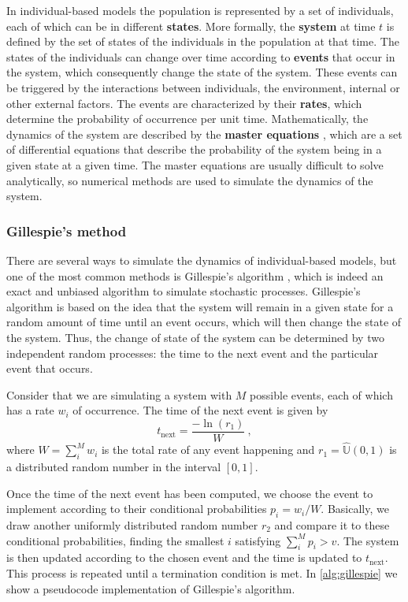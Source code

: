 In individual-based models the population is represented by a set of
individuals, each of which can be in different \textbf{states}. More
formally, the \textbf{system} at time $t$ is defined by the set of states of
the individuals in the population at that time. The states of the individuals
can change over time according to \textbf{events} that occur in the system,
which consequently change the state of the system. These events can be
triggered by the interactions between individuals, the environment, internal or
other external factors. The events are characterized by their \textbf{rates},
which determine the probability of occurrence per unit time. Mathematically,
the dynamics of the system are described by the \textbf{master equations}
\cite{Toral_master_eqs}, which are a set of differential equations that
describe the probability of the system being in a given state at a given
time.
The master equations are usually difficult to solve analytically, so
numerical
methods are used to simulate the dynamics of the system.

\subsubsection*{Gillespie's method}

There are several ways to simulate the dynamics of individual-based models,
but
one of the most common methods is Gillespie's algorithm
\cite{Gillespie1977},
which is indeed an exact and unbiased algorithm to simulate stochastic
processes. Gillespie's algorithm is based on the idea that the system will
remain in a given state for a random amount of time until an event occurs,
which will then change the state of the system. Thus, the change of state of
the system can be determined by two independent random processes: the time to
the next event and the particular event that occurs.

Consider that we are simulating a system with $M$ possible events, each of
which has a rate $w_i$ of occurrence. The time of the next event is given by
\begin{equation}
  t_{\textrm{next}}=\frac{-\ln(r_1)}{W} \ ,
\end{equation}
where $W=\sum_i^M w_i$ is the total rate of any event happening and
$r_1=\hat{\mathbb{U}}(0,1)$ is a distributed random number in the interval
$[0,1]$.

Once the time of the next event has been computed, we choose the event to
implement according to their conditional probabilities $p_i=w_i/W$.
Basically,
we draw another uniformly distributed random number $r_2$ and compare it to
these conditional probabilities, finding the smallest $i$ satisfying
$\sum_i^Mp_i>v$. The system is then updated according to the chosen event and
the time is updated to $t_{\textrm{next}}$. This process is repeated until a
termination condition is met. In \cref{alg:gillespie} we show a pseudocode
implementation of Gillespie's algorithm.

